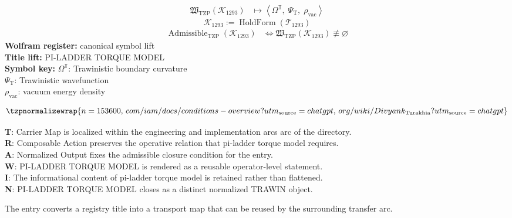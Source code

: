 \noindent
\begin{minipage}[t]{0.48\linewidth}
\begingroup
\small
\[
\begin{aligned}
\mathfrak{W}_{\mathrm{TZP}}\!\left(\mathcal{K}_{1293}\right)
&\longmapsto
\left\langle \Omega^{\mathbb{T}},\; \Psi_{\mathrm{T}},\; \rho_{\mathrm{vac}} \right\rangle
\end{aligned}
\]
\[
\mathcal{K}_{1293}
:=
\operatorname{HoldForm}\!\left(\mathcal{T}_{1293}\right)
\]
\[
\begin{aligned}
\operatorname{Admissible}_{\mathrm{TZP}}\!\left(\mathcal{K}_{1293}\right)
&\Longleftrightarrow
\mathfrak{W}_{\mathrm{TZP}}\!\left(\mathcal{K}_{1293}\right)\not\equiv\varnothing
\end{aligned}
\]
\textbf{Wolfram register:} canonical symbol lift\\
\textbf{Title lift:} PI-LADDER TORQUE MODEL\\
\textbf{Symbol key:} \(\Omega^{\mathbb{T}}\): Trawinistic boundary curvature\\ \(\Psi_{\mathrm{T}}\): Trawinistic wavefunction\\ \(\rho_{\mathrm{vac}}\): vacuum energy density
\par
\endgroup
\end{minipage}\hfill
\begin{minipage}[t]{0.48\linewidth}
\[
\tzpnormalizewrap{n=153600,\,com/iam/docs/conditions-overview?utm_{\mathrm{source}}=chatgpt,\,org/wiki/Divyank_{\mathrm{Turakhia}}?utm_{\mathrm{source}}=chatgpt}
\]

\small
\textbf{T}: Carrier Map is localized within the engineering and implementation arcs arc of the directory.\\
\textbf{R}: Composable Action preserves the operative relation that pi-ladder torque model requires.\\
\textbf{A}: Normalized Output fixes the admissible closure condition for the entry.\\
\textbf{W}: PI-LADDER TORQUE MODEL is rendered as a reusable operator-level statement.\\
\textbf{I}: The informational content of pi-ladder torque model is retained rather than flattened.\\
\textbf{N}: PI-LADDER TORQUE MODEL closes as a distinct normalized TRAWIN object.
\normalsize
\end{minipage}

The entry converts a registry title into a transport map that can be reused by the surrounding transfer arc.
\clearpage

